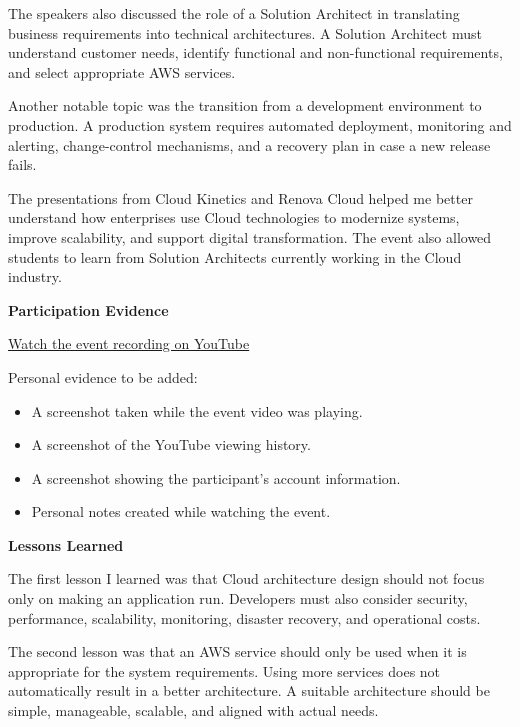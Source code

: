 The speakers also discussed the role of a Solution Architect in
translating business requirements into technical architectures. A
Solution Architect must understand customer needs, identify functional
and non-functional requirements, and select appropriate AWS services.

Another notable topic was the transition from a development environment
to production. A production system requires automated deployment,
monitoring and alerting, change-control mechanisms, and a recovery plan
in case a new release fails.

The presentations from Cloud Kinetics and Renova Cloud helped me better
understand how enterprises use Cloud technologies to modernize systems,
improve scalability, and support digital transformation. The event also
allowed students to learn from Solution Architects currently working in
the Cloud industry.

\vspace{0.5em}\noindent\textbf{Participation Evidence}\par

\href{https://www.youtube.com/live/FKtMkUqyny4?si=SdhD3d67wFy7qNr6}{Watch
the event recording on YouTube}

Personal evidence to be added:

\begin{itemize}
\tightlist
\item
  A screenshot taken while the event video was playing.
\item
  A screenshot of the YouTube viewing history.
\item
  A screenshot showing the participant's account information.
\item
  Personal notes created while watching the event.
\end{itemize}

\vspace{0.5em}\noindent\textbf{Lessons Learned}\par

The first lesson I learned was that Cloud architecture design should not
focus only on making an application run. Developers must also consider
security, performance, scalability, monitoring, disaster recovery, and
operational costs.

The second lesson was that an AWS service should only be used when it is
appropriate for the system requirements. Using more services does not
automatically result in a better architecture. A suitable architecture
should be simple, manageable, scalable, and aligned with actual needs.

